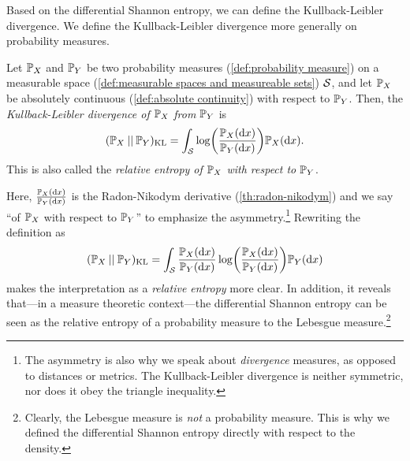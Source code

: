 Based on the differential Shannon entropy, we can define the Kullback-Leibler divergence.
We define the Kullback-Leibler divergence more generally on probability measures.
\begin{definition}
	\label{def:kullback leibler divergence}
	Let \( \mathbb{P}_{X} \) and \( \mathbb{P}_{Y} \) be two probability measures (\cref{def:probability measure}) on a measurable space (\cref{def:measurable spaces and measureable sets}) \( \mathcal{S} \), and let \( \mathbb{P}_{X} \) be absolutely continuous (\cref{def:absolute continuity}) with respect to \( \mathbb{P}_{Y} \).
	Then, the \emph{Kullback-Leibler divergence of \( \mathbb{P}_{X} \) from \( \mathbb{P}_{Y} \)} is
	\begin{equation}
		(\mathbb{P}_{X}\mathbin{||}\mathbb{P}_{Y})_{\mathrm{KL}} = \int_{\mathcal{S}} \log\biggl( \frac{\mathbb{P}_{X}(\mathrm{d}x)}{\mathbb{P}_{Y}(\mathrm{d}x)}\biggr) \mathbb{P}_{X}(\mathrm{d}x).
	\end{equation}
	This is also called the \emph{relative entropy of \( \mathbb{P}_{X} \) with respect to  \( \mathbb{P}_{Y} \)}. 
\end{definition}
Here, \(\frac{\mathbb{P}_{X}(\mathrm{d}x)}{\mathbb{P}_{Y}(\mathrm{d}x)} \) is the Radon-Nikodym derivative (\cref{th:radon-nikodym}) and we say \enquote{of \( \mathbb{P}_{X} \) with respect to \( \mathbb{P}_{Y} \)} to emphasize the asymmetry.\footnote{The asymmetry is also why we speak about \emph{divergence} measures, as opposed to distances or metrics. The Kullback-Leibler divergence is neither symmetric, nor does it obey the triangle inequality.}
Rewriting the definition as
\begin{equation}
	(\mathbb{P}_{X}\mathbin{||}\mathbb{P}_{Y})_{\mathrm{KL}} = \int_{\mathcal{S}} \frac{\mathbb{P}_{X}(\mathrm{d}x)}{\mathbb{P}_{Y}(\mathrm{d}x)} \log\biggl( \frac{\mathbb{P}_{X}(\mathrm{d}x)}{\mathbb{P}_{Y}(\mathrm{d}x)}\biggr) \mathbb{P}_{Y}(\mathrm{d}x)
\end{equation}
makes the interpretation as a \emph{relative entropy} more clear.
In addition, it reveals that---in a measure theoretic context---the differential Shannon entropy can be seen as the relative entropy of a probability measure to the Lebesgue measure.\footnote{
	Clearly, the Lebesgue measure is \emph{not} a probability measure.
	This is why we defined the differential Shannon entropy directly with respect to the density.
}
